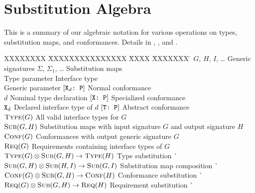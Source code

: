 \documentclass[../generics]{subfiles}
\begin{document}
\chapter{Substitution Algebra}\label{notation summary}

This is a \index{$\otimes$}summary of our algebraic notation for various operations on types, substitution maps, and conformances. Details in , , and .

\begin{tabbing}
XXXXXXXX \= XXXXXXXXXXXXXXX \= XXXX \= XXXXXXX \= \kill
$G$, $H$, $I$, \ldots \> Generic signatures \> \> $\Sigma$, $\Sigma_1$, \ldots \> Substitution maps \\
\tT \> Type parameter \> \> \tX \> Interface type\\
 \> Generic parameter \> \> $[\texttt{$\texttt{X}_d$:~P}]$ \> Normal conformance\\
$d$ \> Nominal type declaration \> \> $[\texttt{X:~P}]$ \> Specialized conformance\\
$\texttt{X}_d$ \> Declared interface type of $d$ \> \> $[\texttt{T:~P}]$ \> Abstract conformance\\[\medskipamount]
$\textsc{Type}({G})$ \> All valid interface types for $G$\\
$\textsc{Sub}({G, H})$ \> Substitution maps with input signature $G$ and output signature $H$\\
$\textsc{Conf}({G})$ \> Conformances with output generic signature $G$\\
$\textsc{Req}({G})$ \> Requirements containing interface types of $G$\\[\bigskipamount]
$\textsc{Type}({G})\otimes\textsc{Sub}({G, H})\rightarrow\textsc{Type}({H})$ \> \> Type substitution \` \\
$\textsc{Sub}({G, H})\otimes\textsc{Sub}({H, I})\rightarrow\textsc{Sub}({G, I})$ \> \> Substitution map composition \` \\
$\textsc{Conf}({G})\otimes\textsc{Sub}({G, H})\rightarrow\textsc{Conf}({H})$ \> \> Conformance substitution \` \\
$\textsc{Req}({G})\otimes\textsc{Sub}({G, H})\rightarrow\textsc{Req}({H})$ \> \> Requirement substitution \` 
\end{tabbing}
\end{document}
